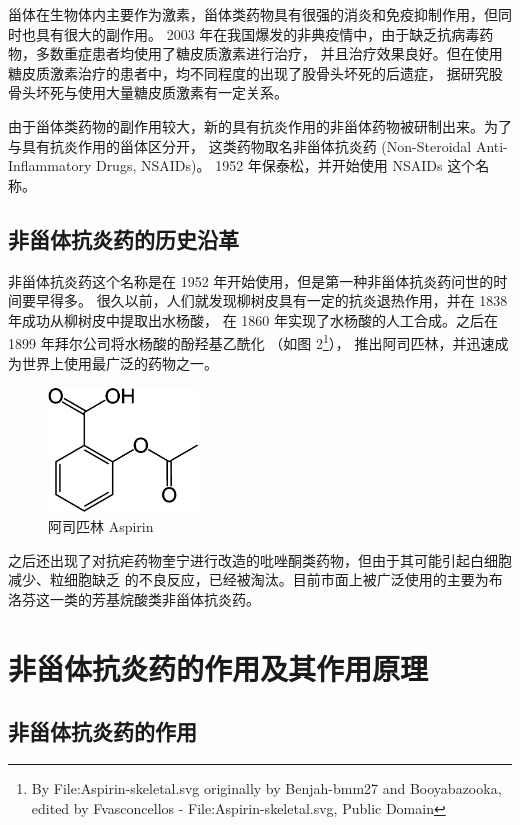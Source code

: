 \documentclass[12pt, a4paper, oneside]{ctexart}
\begin{document}
甾体在生物体内主要作为激素，甾体类药物具有很强的消炎和免疫抑制作用，但同时也具有很大的副作用。
2003 年在我国爆发的非典疫情中，由于缺乏抗病毒药物，多数重症患者均使用了糖皮质激素进行治疗，
并且治疗效果良好。但在使用糖皮质激素治疗的患者中，均不同程度的出现了股骨头坏死的后遗症，
据研究股骨头坏死与使用大量糖皮质激素有一定关系\cite{ref2}。

由于甾体类药物的副作用较大，新的具有抗炎作用的非甾体药物被研制出来。为了与具有抗炎作用的甾体区分开，
这类药物取名非甾体抗炎药 (Non-Steroidal Anti-Inflammatory Drugs, NSAIDs)。
1952 年保泰松，并开始使用 NSAIDs 这个名称。

\subsection{非甾体抗炎药的历史沿革}
非甾体抗炎药这个名称是在 1952 年开始使用，但是第一种非甾体抗炎药问世的时间要早得多。
很久以前，人们就发现柳树皮具有一定的抗炎退热作用，并在 1838 年成功从柳树皮中提取出水杨酸，
在 1860 年实现了水杨酸的人工合成。之后在 1899 年拜尔公司将水杨酸的酚羟基乙酰化
（如图 2\footnote{By File:Aspirin-skeletal.svg originally by Benjah-bmm27 and Booyabazooka, edited by Fvasconcellos - File:Aspirin-skeletal.svg, Public Domain}），
推出阿司匹林，并迅速成为世界上使用最广泛的药物之一。

\begin{figure}[htbp]
    \centering
    \includegraphics[width=4cm]{Aspirin-skeletal.pdf}
    \caption{阿司匹林 Aspirin}
\end{figure}

之后还出现了对抗疟药物奎宁进行改造的吡唑酮类药物，但由于其可能引起白细胞减少、粒细胞缺乏
的不良反应，已经被淘汰。目前市面上被广泛使用的主要为布洛芬这一类的芳基烷酸类非甾体抗炎药。

\newpage
\section{非甾体抗炎药的作用及其作用原理}
\subsection{非甾体抗炎药的作用}
\end{document}
